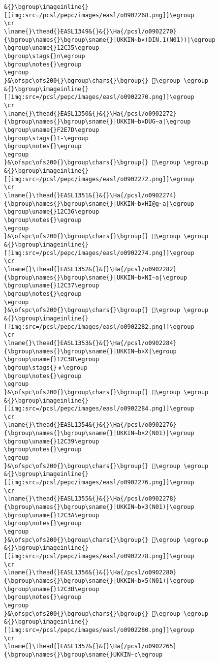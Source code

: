 \begin{verbatim}
&{}\bgroup\imageinline{}[[img:src=/pcsl/pepc/images/easl/o0902268.png]]\egroup
\cr
\lname{}\thead{}EASL1349&{}&{}\Ha{/pcsl/o0902270}{\bgroup\names{}\bgroup\sname{}|UKKIN∼b×(DIN.1(N01))|\egroup
\bgroup\uname{}12C35\egroup
\bgroup\stags{}n\egroup
\bgroup\notes{}\egroup
\egroup
}&\ofspc\ofs200{}\bgroup\chars{}\bgroup{} 𒰵\egroup \egroup
&{}\bgroup\imageinline{}[[img:src=/pcsl/pepc/images/easl/o0902270.png]]\egroup
\cr
\lname{}\thead{}EASL1350&{}&{}\Ha{/pcsl/o0902272}{\bgroup\names{}\bgroup\sname{}|UKKIN∼b×DUG∼a|\egroup
\bgroup\uname{}F2E7D\egroup
\bgroup\stags{}1-\egroup
\bgroup\notes{}\egroup
\egroup
}&\ofspc\ofs200{}\bgroup\chars{}\bgroup{} 󲹽\egroup \egroup
&{}\bgroup\imageinline{}[[img:src=/pcsl/pepc/images/easl/o0902272.png]]\egroup
\cr
\lname{}\thead{}EASL1351&{}&{}\Ha{/pcsl/o0902274}{\bgroup\names{}\bgroup\sname{}|UKKIN∼b×HI@g∼a|\egroup
\bgroup\uname{}12C36\egroup
\bgroup\notes{}\egroup
\egroup
}&\ofspc\ofs200{}\bgroup\chars{}\bgroup{} 𒰶\egroup \egroup
&{}\bgroup\imageinline{}[[img:src=/pcsl/pepc/images/easl/o0902274.png]]\egroup
\cr
\lname{}\thead{}EASL1352&{}&{}\Ha{/pcsl/o0902282}{\bgroup\names{}\bgroup\sname{}|UKKIN∼b×NI∼a|\egroup
\bgroup\uname{}12C37\egroup
\bgroup\notes{}\egroup
\egroup
}&\ofspc\ofs200{}\bgroup\chars{}\bgroup{} 𒰷\egroup \egroup
&{}\bgroup\imageinline{}[[img:src=/pcsl/pepc/images/easl/o0902282.png]]\egroup
\cr
\lname{}\thead{}EASL1353&{}&{}\Ha{/pcsl/o0902284}{\bgroup\names{}\bgroup\sname{}|UKKIN∼b×X|\egroup
\bgroup\uname{}12C38\egroup
\bgroup\stags{}﹟\egroup
\bgroup\notes{}\egroup
\egroup
}&\ofspc\ofs200{}\bgroup\chars{}\bgroup{} 𒰸\egroup \egroup
&{}\bgroup\imageinline{}[[img:src=/pcsl/pepc/images/easl/o0902284.png]]\egroup
\cr
\lname{}\thead{}EASL1354&{}&{}\Ha{/pcsl/o0902276}{\bgroup\names{}\bgroup\sname{}|UKKIN∼b×2(N01)|\egroup
\bgroup\uname{}12C39\egroup
\bgroup\notes{}\egroup
\egroup
}&\ofspc\ofs200{}\bgroup\chars{}\bgroup{} 𒰹\egroup \egroup
&{}\bgroup\imageinline{}[[img:src=/pcsl/pepc/images/easl/o0902276.png]]\egroup
\cr
\lname{}\thead{}EASL1355&{}&{}\Ha{/pcsl/o0902278}{\bgroup\names{}\bgroup\sname{}|UKKIN∼b×3(N01)|\egroup
\bgroup\uname{}12C3A\egroup
\bgroup\notes{}\egroup
\egroup
}&\ofspc\ofs200{}\bgroup\chars{}\bgroup{} 𒰺\egroup \egroup
&{}\bgroup\imageinline{}[[img:src=/pcsl/pepc/images/easl/o0902278.png]]\egroup
\cr
\lname{}\thead{}EASL1356&{}&{}\Ha{/pcsl/o0902280}{\bgroup\names{}\bgroup\sname{}|UKKIN∼b×5(N01)|\egroup
\bgroup\uname{}12C3B\egroup
\bgroup\notes{}\egroup
\egroup
}&\ofspc\ofs200{}\bgroup\chars{}\bgroup{} 𒰻\egroup \egroup
&{}\bgroup\imageinline{}[[img:src=/pcsl/pepc/images/easl/o0902280.png]]\egroup
\cr
\lname{}\thead{}EASL1357&{}&{}\Ha{/pcsl/o0902265}{\bgroup\names{}\bgroup\sname{}UKKIN∼c\egroup

\end{verbatim}
